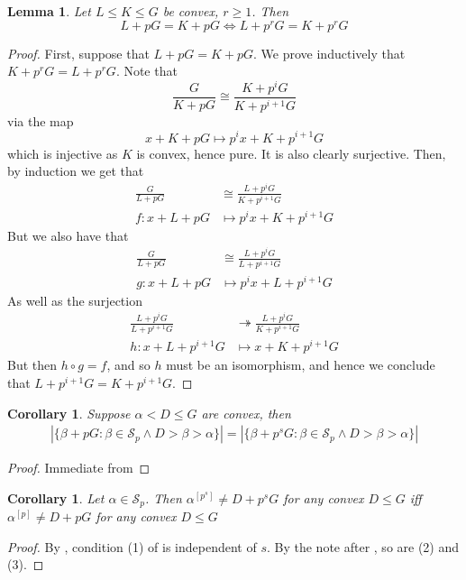 \documentclass[a4paper,11pt]{article}
\newtheorem{lemma}[theorem]{Lemma}
\newtheorem{corollary}[theorem]{Corollary}
\renewcommand{\iff}{\Longleftrightarrow}
\begin{document}
\begin{lemma}\label{equal p-divisibility}
	Let $L\leq K\leq G$ be convex, $r\geq 1$. Then $$L + pG = K+pG\iff L+p^rG = K + p^rG$$
\end{lemma}
\begin{proof}
	First, suppose that $L+pG = K + pG$. We prove inductively that $K+p^rG= L+p^rG$. Note that
	$$\frac{G}{K+pG}\cong\frac{K+p^iG}{K+p^{i+1}G}$$ via the map $$x+K+pG\mapsto p^ix + K+p^{i+1}G$$
	which is injective as $K$ is convex, hence pure. It is also clearly surjective. Then, by induction we get that
	\begin{align*}
		\frac{G}{L+pG}&\cong \frac{L+p^iG}{K+p^{i+1}G}\\
		f:x+L+pG&\mapsto p^ix + K+p^{i+1}G
	\end{align*}
	But we also have that
	\begin{align*}
		\frac{G}{L+pG}&\cong \frac{L+p^iG}{L+p^{i+1}G}\\
		g:x+L+pG&\mapsto p^ix + L+p^{i+1}G
	\end{align*}
	As well as the surjection
	\begin{align*}
		\frac{L+p^iG}{L+p^{i+1}G}&\twoheadrightarrow\frac{L+p^iG}{K+p^{i+1}G} \\
		h:x + L+p^{i+1}G &\mapsto x + K + p^{i+1}G
	\end{align*}
	But then $h\circ g = f$, and so $h$ must be an isomorphism, and hence we conclude that $L+p^{i+1}G=K+p^{i+1}G$.
\end{proof}

\begin{corollary}\label{same number above}
	Suppose $\alpha< D\leq G$ are convex, then
	\begin{align*}
		|\{\beta+pG :\beta\in\mathcal{S}_p\wedge D>\beta>\alpha\}|= |\{\beta+p^sG :\beta\in\mathcal{S}_p\wedge D>\beta>\alpha\}|
	\end{align*}
\end{corollary}
\begin{proof}
	Immediate from 
\end{proof}
\begin{corollary}
	Let $\alpha\in \mathcal{S}_p$. Then $\alpha^{[p^s]} \neq D+p^sG$ for any convex $D\leq G$ iff $\alpha^{[p]} \neq D+pG$ for any convex $D\leq G$
\end{corollary}
\begin{proof}
	By , condition (1) of  is independent of $s$. By the note after , so are (2) and (3).
\end{proof}
\end{document}
